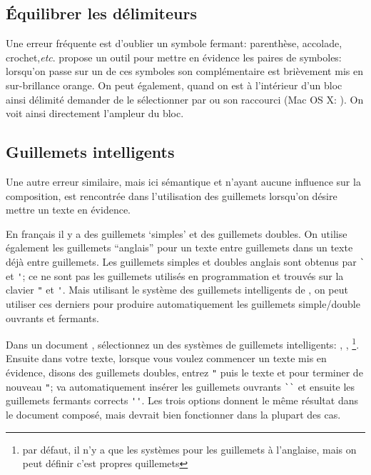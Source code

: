 \subsection{Équilibrer les délimiteurs}

Une erreur fréquente est d'oublier un symbole fermant: parenthèse, accolade, crochet,\emph{etc}. \Tw{} propose un outil pour mettre en évidence les paires de symboles: lorsqu'on passe sur un de ces symboles son complémentaire est brièvement mis en sur-brillance orange. On peut également, quand on est à l'intérieur d'un bloc ainsi délimité demander de le sélectionner par \submenu{} ou son raccourci  (Mac OS X: ). On voit ainsi directement l'ampleur du bloc.

\subsection{Guillemets intelligents}

Une autre erreur similaire, mais ici sémantique et n'ayant aucune influence sur la composition, est rencontrée dans l'utilisation des guillemets lorsqu'on désire mettre un texte en évidence.

En français il y a des guillemets `simples' et des guillemets \og{}doubles\fg. On utilise également les guillemets ``anglais'' pour un texte entre guillemets dans un texte déjà entre guillemets. Les guillemets simples et doubles anglais sont obtenus par \verb|`| et \verb|'|; ce ne sont pas les guillemets utilisés en programmation et trouvés sur la clavier \verb|"| et \verb|'|. Mais utilisant le système des guillemets intelligents de \Tw, on peut utiliser ces derniers pour produire automatiquement les guillemets simple/double ouvrants et fermants.

Dans un document , sélectionnez un des systèmes de guillemets intelligents: \submenu{}\submenu{}, \submenu{}, \submenu{} \footnote{par défaut, il n'y a que les systèmes pour les guillemets à l'anglaise, mais on peut définir c'est propres quillemets}. Ensuite dans votre texte, lorsque vous voulez commencer un texte mis en évidence, disons des guillemets doubles, entrez \verb|"| puis le texte et pour terminer de nouveau \verb|"|; \Tw{} va automatiquement insérer les guillemets ouvrants \verb|``| et ensuite les guillemets fermants corrects \verb|''|. Les trois options donnent le même résultat dans le document composé, mais  devrait bien fonctionner dans la plupart des cas.

